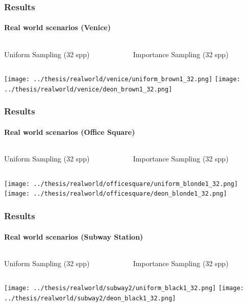 \documentclass{beamer}
\begin{document}
  \begin{frame}
    \frametitle{Results}
    \framesubtitle{Real world scenarios (Venice)}
    \centering
    
    \begin{columns}
    \begin{column}{0.5\textwidth}
    \centering
    Uniform Sampling (32 spp) 
    \end{column}
	\begin{column}{0.5\textwidth}
	\centering
	Importance Sampling (32 spp)
	\end{column}
	\end{columns}  
    
	\texttt{[image: ../thesis/realworld/venice/uniform\_brown1\_32.png]}  
	\texttt{[image: ../thesis/realworld/venice/deon\_brown1\_32.png]}   
  \end{frame}
  
  \begin{frame}
    \frametitle{Results}
    \framesubtitle{Real world scenarios (Office Square)}
    \centering
    
    \begin{columns}
    \begin{column}{0.5\textwidth}
    \centering
    Uniform Sampling (32 spp) 
    \end{column}
	\begin{column}{0.5\textwidth}
	\centering
	Importance Sampling (32 spp)
	\end{column}
	\end{columns}  
    
	\texttt{[image: ../thesis/realworld/officesquare/uniform\_blonde1\_32.png]}  
	\texttt{[image: ../thesis/realworld/officesquare/deon\_blonde1\_32.png]}   
  \end{frame}
  
    \begin{frame}
    \frametitle{Results}
    \framesubtitle{Real world scenarios (Subway Station)}
    \centering
    
    \begin{columns}
    \begin{column}{0.5\textwidth}
    \centering
    Uniform Sampling (32 spp) 
    \end{column}
	\begin{column}{0.5\textwidth}
	\centering
	Importance Sampling (32 spp)
	\end{column}
	\end{columns}  
    
	\texttt{[image: ../thesis/realworld/subway2/uniform\_black1\_32.png]}  
	\texttt{[image: ../thesis/realworld/subway2/deon\_black1\_32.png]}   
  \end{frame}
  
\end{document}

